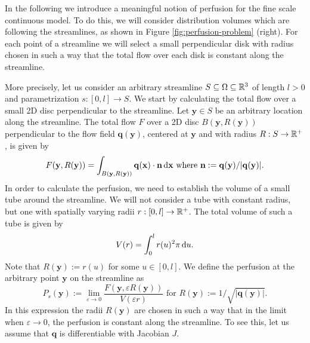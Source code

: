 \documentclass[final,5p,times,twocolumn]{elsarticle}
\begin{document}
	In the following we introduce a meaningful notion of perfusion for the fine scale continuous model.
	To do this, we will consider distribution volumes which are following the streamlines, as shown in Figure \ref{fig:perfusion-problem} (right). 	
	For each point of a streamline we will select a small perpendicular disk with radius chosen in such a way that the total flow over each disk is constant along the streamline.

	More precisely, let us consider an arbitrary streamline $S \subseteq \Omega \subseteq \mathbb{R}^3$ of length $l>0$ and parametrization $s:[0,l] \to S$.
	We start by calculating the total flow over a small 2D disc perpendicular to the streamline.
	Let $\mathbf{y} \in S$ be an arbitrary location along the streamline. 
	The total flow $F$ over a 2D disc $B(\mathbf{y},R(\mathbf{y}))$ perpendicular to the flow field $\mathbf{q}(\mathbf{y})$, centered at $\mathbf{y}$ and with radius $R:S\to\mathbb{R}^+$, is given by
	\begin{equation}
		F(\mathbf{y},R(\mathbf{y})) = \int_{B(\mathbf{y},R(\mathbf{y}))} \mathbf{q}(\mathbf{x}) \cdot \mathbf{n} \,\mathrm{d} \mathbf{x} \text{ where }\mathbf{n} := \mathbf{q}(\mathbf{y})/\vert \mathbf{q}(\mathbf{y}) \vert.
		\label{eq:Fdisc}
	\end{equation}
	In order to calculate the perfusion, we need to establish the volume of a small tube around the streamline.
	We will not consider a tube with constant radius, but one with spatially varying radii $r:[0,l] \to \mathbb{R}^+$.
	The total volume of such a tube is given by
	\begin{equation}
		V(r) = \int_0^l r(u)^2 \pi \,\mathrm{d} u.
	\end{equation}
        Note that $R(\mathbf{y}):=r(u)$ for some $u \in [0,l]$.
        We define the perfusion at the arbitrary point $\mathbf{y}$ on the streamline as
	\begin{equation}
		P_s(\mathbf{y}):=  \lim_{\varepsilon \to 0} \frac{F(\mathbf{y},\varepsilon R(\mathbf{y}))}{V(\varepsilon r)} \text{ for } R(\mathbf{y}):=1/\sqrt{\vert \mathbf{q}(\mathbf{y}) \vert}.
		\label{eq:perfusiondef}
	\end{equation}
	In this expression the radii $R(\mathbf{y})$ are chosen in such a way that in the limit when $\varepsilon \to 0$, the perfusion is constant along the streamline. 
	To see this, let us assume that $\mathbf{q}$ is differentiable with Jacobian $J$.
\end{document}
